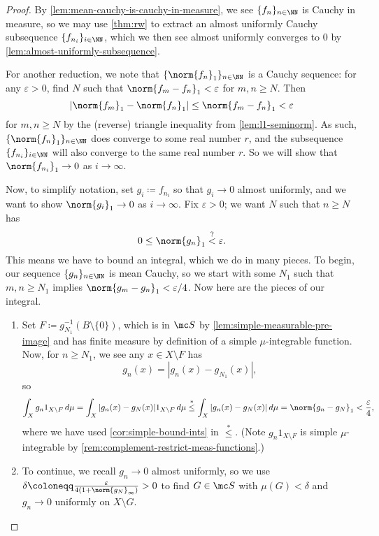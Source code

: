 \documentclass[../notes.tex]{subfiles}
\begin{document}
\begin{proof}
	By \autoref{lem:mean-cauchy-is-cauchy-in-measure}, we see $\{f_n\}_{n\in\NN}$ is Cauchy in measure, so we may use \autoref{thm:rw} to extract an almost uniformly Cauchy subsequence $\{f_{n_i}\}_{i\in\NN}$, which we then see almost uniformly converges to $0$ by \autoref{lem:almost-uniformly-subsequence}.
	
	For another reduction, we note that $\{\norm{f_n}_1\}_{n\in\NN}$ is a Cauchy sequence: for any $\varepsilon>0$, find $N$ such that $\norm{f_m-f_n}_1<\varepsilon$ for $m,n\ge N$. Then
	\[|\norm{f_m}_1-\norm{f_n}_1|\le\norm{f_m-f_n}_1<\varepsilon\]
	for $m,n\ge N$ by the (reverse) triangle inequality from \autoref{lem:l1-seminorm}. As such, $\{\norm{f_n}_1\}_{n\in\NN}$ does converge to some real number $r$, and the subsequence $\{f_{n_i}\}_{i\in\NN}$ will also converge to the same real number $r$. So we will show that $\norm{f_{n_i}}_1\to0$ as $i\to\infty$.

	Now, to simplify notation, set $g_i\coloneqq f_{n_i}$ so that $g_i\to0$ almost uniformly, and we want to show $\norm{g_i}_1\to0$ as $i\to\infty$. Fix $\varepsilon>0$; we want $N$ such that $n\ge N$ has
	\[0\le\norm{g_n}_1\stackrel?<\varepsilon.\]
	This means we have to bound an integral, which we do in many pieces. To begin, our sequence $\{g_n\}_{n\in\NN}$ is mean Cauchy, so we start with some $N_1$ such that $m,n\ge N_1$ implies $\norm{g_m-g_n}_1<\varepsilon/4$. Now here are the pieces of our integral.
	\begin{enumerate}
		\item Set $F\coloneqq g_{N_1}^{-1}(B\setminus\{0\})$, which is in $\mc S$ by \autoref{lem:simple-measurable-pre-image} and has finite measure by definition of a simple $\mu$-integrable function.
		Now, for $n\ge N_1$, we see any $x\in X\setminus F$ has
		\[g_n(x)=|g_n(x)-g_{N_1}(x)|,\]
		so
		\[\int_Xg_n1_{X\setminus F}\,d\mu=\int_X|g_n(x)-g_N(x)|1_{X\setminus F}\,d\mu\stackrel*\le\int_X|g_n(x)-g_N(x)|\,d\mu=\norm{g_n-g_N}_1<\frac\varepsilon4,\]
		where we have used \autoref{cor:simple-bound-ints} in $\stackrel*\le$. (Note $g_n1_{X\setminus F}$ is simple $\mu$-integrable by \autoref{rem:complement-restrict-meas-functions}.)

		\item To continue, we recall $g_n\to0$ almost uniformly, so we use $\delta\coloneqq\frac\varepsilon{4(1+\norm{g_N}_\infty)}>0$ to find $G\in\mc S$ with $\mu(G)<\delta$ and $g_n\to0$ uniformly on $X\setminus G$.
	

\end{enumerate}
\end{proof}
\end{document}

